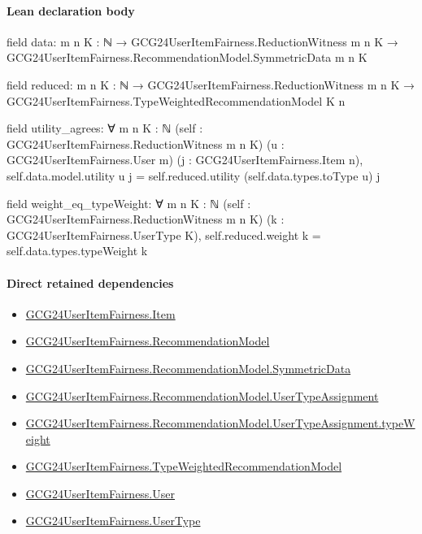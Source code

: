 \documentclass[10pt]{article}
\begin{document}
\paragraph{Lean declaration body}
\begin{ReviewVerbatim}
field data:
{m n K : ℕ} →
  GCG24UserItemFairness.ReductionWitness m n K → GCG24UserItemFairness.RecommendationModel.SymmetricData m n K

field reduced:
{m n K : ℕ} → GCG24UserItemFairness.ReductionWitness m n K → GCG24UserItemFairness.TypeWeightedRecommendationModel K n

field utility_agrees:
∀ {m n K : ℕ} (self : GCG24UserItemFairness.ReductionWitness m n K) (u : GCG24UserItemFairness.User m)
  (j : GCG24UserItemFairness.Item n), self.data.model.utility u j = self.reduced.utility (self.data.types.toType u) j

field weight_eq_typeWeight:
∀ {m n K : ℕ} (self : GCG24UserItemFairness.ReductionWitness m n K) (k : GCG24UserItemFairness.UserType K),
  self.reduced.weight k = self.data.types.typeWeight k
\end{ReviewVerbatim}

\paragraph{Direct retained dependencies}
\begin{itemize}\raggedright
\item \hyperlink{governing-declaration-a7c560a429c6e204}{GCG24\allowbreak{}User\allowbreak{}Item\allowbreak{}Fairness.\allowbreak{}Item}
\item \hyperlink{governing-declaration-4b845f20f80fb146}{GCG24\allowbreak{}User\allowbreak{}Item\allowbreak{}Fairness.\allowbreak{}Recommendation\allowbreak{}Model}
\item \hyperlink{governing-declaration-5bf2c3489c614d0a}{GCG24\allowbreak{}User\allowbreak{}Item\allowbreak{}Fairness.\allowbreak{}Recommendation\allowbreak{}Model.\allowbreak{}Symmetric\allowbreak{}Data}
\item \hyperlink{governing-declaration-ff90b1efab93f1aa}{GCG24\allowbreak{}User\allowbreak{}Item\allowbreak{}Fairness.\allowbreak{}Recommendation\allowbreak{}Model.\allowbreak{}User\allowbreak{}Type\allowbreak{}Assignment}
\item \hyperlink{governing-declaration-9b21245f9866121e}{GCG24\allowbreak{}User\allowbreak{}Item\allowbreak{}Fairness.\allowbreak{}Recommendation\allowbreak{}Model.\allowbreak{}User\allowbreak{}Type\allowbreak{}Assignment.\allowbreak{}type\allowbreak{}Weight}
\item \hyperlink{governing-declaration-9d0d71ba8ee67837}{GCG24\allowbreak{}User\allowbreak{}Item\allowbreak{}Fairness.\allowbreak{}Type\allowbreak{}Weighted\allowbreak{}Recommendation\allowbreak{}Model}
\item \hyperlink{governing-declaration-800dd691bc989470}{GCG24\allowbreak{}User\allowbreak{}Item\allowbreak{}Fairness.\allowbreak{}User}
\item \hyperlink{governing-declaration-fd2c25ccc96ab645}{GCG24\allowbreak{}User\allowbreak{}Item\allowbreak{}Fairness.\allowbreak{}User\allowbreak{}Type}
\end{itemize}
\hypertarget{governing-declaration-ace8ed4ceeedef3f}{}
\end{document}
